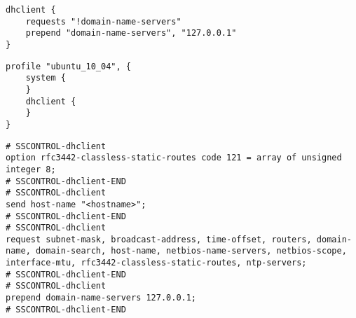 
\begin{lstlisting}[style=Java,label=lst:dhclient_example_script,
title={Example script for the Dhclient service. It will remove the domain name servers from the DHCP request and use the DNS server on the localhost.}]
dhclient {
    requests "!domain-name-servers"
    prepend "domain-name-servers", "127.0.0.1"
}
\end{lstlisting}

\begin{lstlisting}[style=Java,label=lst:dhclient_ubuntu_profile_min,
title={Minimal Ubuntu Dhclient profile, all needed profile properties are already set to sensible default values.}]
profile "ubuntu_10_04", {
    system {
    }
    dhclient {
    }
}
\end{lstlisting}

\begin{lstlisting}[style=rcfile_nonumbers,
label=lst:dhclient_maincf_example,
title={Example of the DHCP configuration file that is created from the Dhclient profile.
The file is saved as /etc/dhcp3/dhclient.conf}]
# SSCONTROL-dhclient
option rfc3442-classless-static-routes code 121 = array of unsigned integer 8;
# SSCONTROL-dhclient-END
# SSCONTROL-dhclient
send host-name "<hostname>";
# SSCONTROL-dhclient-END
# SSCONTROL-dhclient
request subnet-mask, broadcast-address, time-offset, routers, domain-name, domain-search, host-name, netbios-name-servers, netbios-scope, interface-mtu, rfc3442-classless-static-routes, ntp-servers;
# SSCONTROL-dhclient-END
# SSCONTROL-dhclient
prepend domain-name-servers 127.0.0.1;
# SSCONTROL-dhclient-END
\end{lstlisting}

